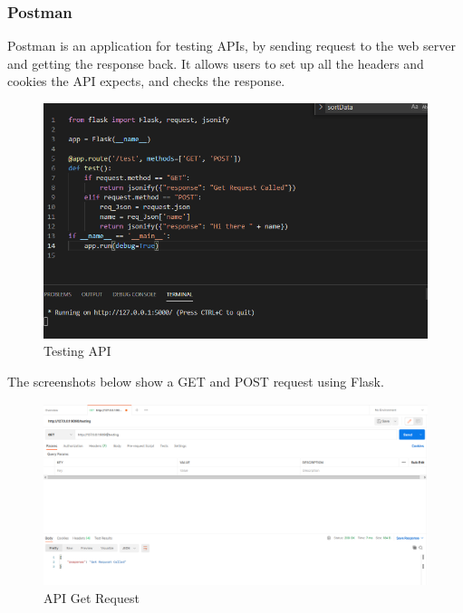 \subsubsection{Postman}
Postman is an application for testing APIs, by sending request to the web server and getting the response back. It allows users to set up all the headers and cookies the API expects, and checks the response.\cite{Postman}

\begin{figure}[ht]
    \centering
    \includegraphics[scale=0.46]{img/TestCode.PNG}
    \caption{Testing API}
    \label{fig:my_label10}
\end{figure}

The screenshots below show a GET and POST request using Flask.

\begin{figure}[ht]
    \centering
    \includegraphics[scale=0.33]{img/TestGet.PNG}
    \caption{API Get Request}
    \label{fig:my_label11}
\end{figure}

